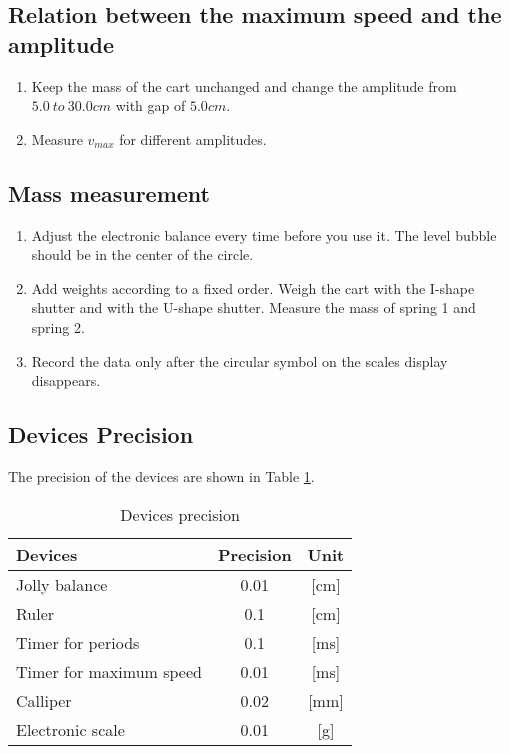 \subsection{Relation between the maximum speed and the amplitude}
    \begin{enumerate}
        \item Keep the mass of the cart unchanged and change the amplitude from $5.0\ to\ 30.0 cm$ with gap of $5.0cm$.
        \item Measure $v_{max}$ for different amplitudes.
    \end{enumerate}

\subsection{Mass measurement}
    \begin{enumerate}
        \item Adjust the electronic balance every time before you use it. The level bubble should be in the center of the circle.
        \item Add weights according to a fixed order. Weigh the cart with the I-shape shutter and with the U-shape shutter. Measure the mass of spring 1 and spring 2.
        \item Record the data only after the circular symbol on the scales display disappears.
    \end{enumerate}

\subsection{Devices Precision}
    The precision of the devices are shown in Table \ref{precision}.
    \begin{table}
        \centering
        \begin{tabular}{|l|c|c|}
            \hline
            Devices & Precision & Unit\\ \hline
            Jolly balance & 0.01 & [cm]\\ \hline
            Ruler & 0.1 & [cm]\\ \hline
            Timer for periods & 0.1 & [ms]\\ \hline
            Timer for maximum speed & 0.01 & [ms]\\ \hline
            Calliper & 0.02 & [mm]\\ \hline
            Electronic scale & 0.01 & [g]\\ \hline
        \end{tabular}
        \caption{Devices precision}\label{precision}
    \end{table}